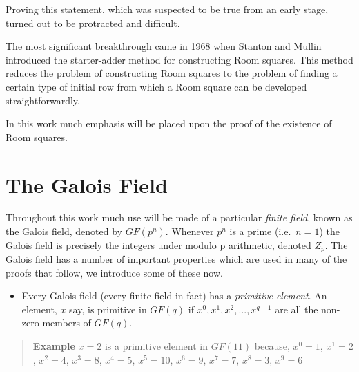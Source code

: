 \documentclass[
  11pt,
  a4paper]{book}
\providecommand{\tightlist}{%
  \setlength{\itemsep}{0pt}\setlength{\parskip}{0pt}}
\newcounter{examplecounter}
\begin{document}
Proving this statement, which was suspected to be true from an early
stage, turned out to be protracted and difficult.

The most significant breakthrough came in 1968 when Stanton and Mullin
introduced the starter-adder method for constructing Room squares. This
method reduces the problem of constructing Room squares to the problem
of finding a certain type of initial row from which a Room square can be
developed straightforwardly.

In this work much emphasis will be placed upon the proof of the
existence of Room squares.

\hypertarget{the-galois-field}{%
\section{The Galois Field}\label{the-galois-field}}

Throughout this work much use will be made of a particular \emph{finite
field}, known as the Galois field, denoted by \(GF(p^n)\). Whenever \(p^n\)
is a prime (i.e.~\(n=1\)) the Galois field is precisely the integers under
modulo p arithmetic, denoted \(Z_p\). The Galois field has a number of
important properties which are used in many of the proofs that follow,
we introduce some of these now.

\begin{itemize}
\tightlist
\item
  Every Galois field (every finite field in fact) has a \emph{primitive
  element}. An element, \(x\) say, is primitive in \(GF(q)\) if
  \(x^0,x^1,x^2,...,x^{q-1}\) are all the non-zero members of \(GF(q)\).
\end{itemize}

\begin{quote}  \textbf{Example } \quad 
$x = 2$ is a primitive element in $GF(11)$ because,
$x^0 = 1$, $x^1 = 2$, $x^2 = 4$, $x^3 = 8$, $x^4 = 5$,
$x^5 = 10$, $x^6 = 9$, $x^7 = 7$, $x^8 = 3$, $x^9 = 6$
 \end{quote}
\end{document}
